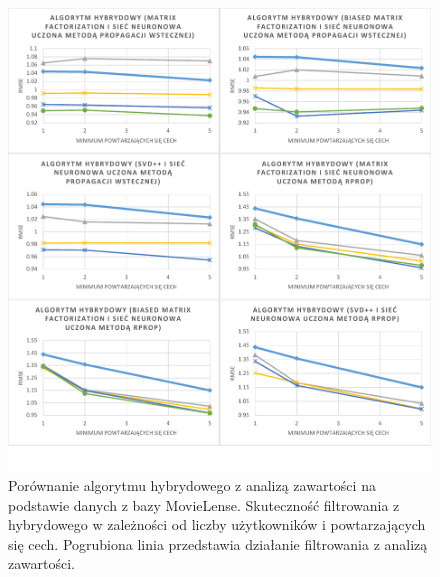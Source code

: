 \documentclass[twoside]{iisthesis}
\begin{document}
\begin{figure}[!ht]
	\centering
	\includegraphics[page=2,width=1\textwidth]{exphybrid_movielens1}
	\caption{Porównanie algorytmu hybrydowego z analizą zawartości na podstawie danych z bazy MovieLense. Skuteczność filtrowania z hybrydowego w zależności od liczby użytkowników i powtarzających się cech. Pogrubiona linia przedstawia działanie filtrowania z analizą zawartości.}
	\label{fig:exphybrid_movielens1b}
\end{figure}

\end{document}
